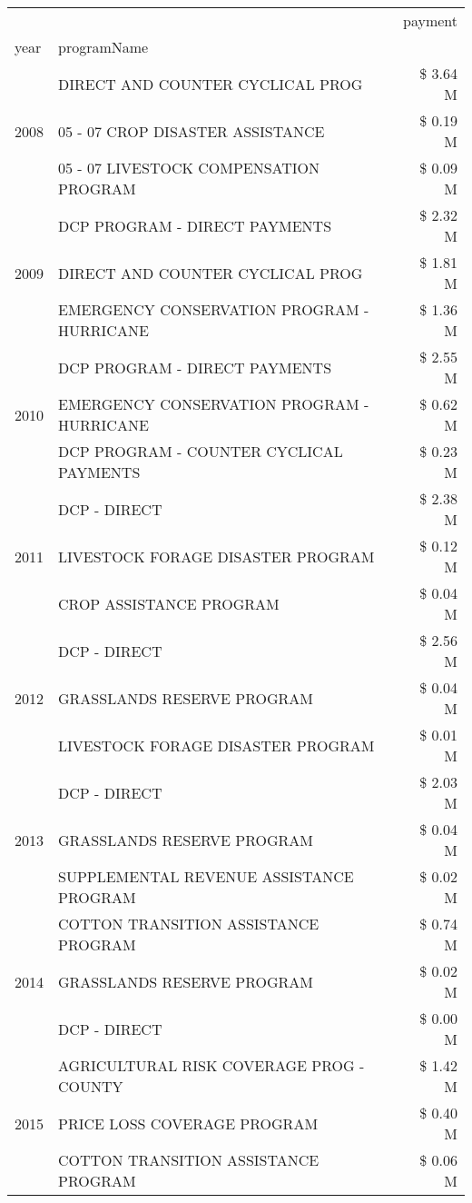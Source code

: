 \begin{tabular}{llr}
\toprule
 &  & payment \\
year & programName &  \\
\midrule
\multirow[t]{3}{*}{2008} & DIRECT AND COUNTER CYCLICAL PROG & \$ 3.64 M \\
 & 05 - 07 CROP DISASTER ASSISTANCE & \$ 0.19 M \\
 & 05 - 07 LIVESTOCK COMPENSATION PROGRAM & \$ 0.09 M \\
\cline{1-3}
\multirow[t]{3}{*}{2009} & DCP PROGRAM - DIRECT PAYMENTS & \$ 2.32 M \\
 & DIRECT AND COUNTER CYCLICAL PROG & \$ 1.81 M \\
 & EMERGENCY CONSERVATION PROGRAM - HURRICANE & \$ 1.36 M \\
\cline{1-3}
\multirow[t]{3}{*}{2010} & DCP PROGRAM - DIRECT PAYMENTS & \$ 2.55 M \\
 & EMERGENCY CONSERVATION PROGRAM - HURRICANE & \$ 0.62 M \\
 & DCP PROGRAM - COUNTER CYCLICAL PAYMENTS & \$ 0.23 M \\
\cline{1-3}
\multirow[t]{3}{*}{2011} & DCP - DIRECT & \$ 2.38 M \\
 & LIVESTOCK FORAGE DISASTER PROGRAM & \$ 0.12 M \\
 & CROP ASSISTANCE PROGRAM & \$ 0.04 M \\
\cline{1-3}
\multirow[t]{3}{*}{2012} & DCP - DIRECT & \$ 2.56 M \\
 & GRASSLANDS RESERVE PROGRAM & \$ 0.04 M \\
 & LIVESTOCK FORAGE DISASTER PROGRAM & \$ 0.01 M \\
\cline{1-3}
\multirow[t]{3}{*}{2013} & DCP - DIRECT & \$ 2.03 M \\
 & GRASSLANDS RESERVE PROGRAM & \$ 0.04 M \\
 & SUPPLEMENTAL REVENUE ASSISTANCE PROGRAM & \$ 0.02 M \\
\cline{1-3}
\multirow[t]{3}{*}{2014} & COTTON TRANSITION ASSISTANCE PROGRAM & \$ 0.74 M \\
 & GRASSLANDS RESERVE PROGRAM & \$ 0.02 M \\
 & DCP - DIRECT & \$ 0.00 M \\
\cline{1-3}
\multirow[t]{3}{*}{2015} & AGRICULTURAL RISK COVERAGE PROG - COUNTY & \$ 1.42 M \\
 & PRICE LOSS COVERAGE PROGRAM & \$ 0.40 M \\
 & COTTON TRANSITION ASSISTANCE PROGRAM & \$ 0.06 M \\

\end{tabular}
